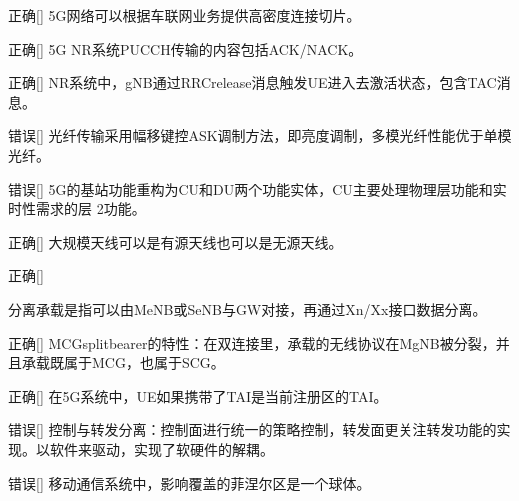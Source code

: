\begin{choice}{\;正确\;}[]
    5G网络可以根据车联网业务提供高密度连接切片。
\end{choice}

\begin{choice}{\;正确\;}[]
    5G NR系统PUCCH传输的内容包括ACK/NACK。
\end{choice}

\begin{choice}{\;正确\;}[]
    NR系统中，gNB通过RRCrelease消息触发UE进入去激活状态，包含TAC消息。
\end{choice}

\begin{choice}{\;错误\;}[]
    光纤传输采用幅移键控ASK调制方法，即亮度调制，多模光纤性能优于单模光纤。

\end{choice}


\begin{choice}{\;错误\;}[]
    5G的基站功能重构为CU和DU两个功能实体，CU主要处理物理层功能和实时性需求的层 2功能。

\end{choice}

\begin{choice}{\;正确\;}[]
    大规模天线可以是有源天线也可以是无源天线。

\end{choice}

\begin{choice}{\;正确\;}[]

    分离承载是指可以由MeNB或SeNB与GW对接，再通过Xn/Xx接口数据分离。
\end{choice}


\begin{choice}{\;正确\;}[]
    MCGsplitbearer的特性：在双连接里，承载的无线协议在MgNB被分裂，并且承载既属于MCG，也属于SCG。

\end{choice}

\begin{choice}{\;正确\;}[]
    在5G系统中，UE如果携带了TAI是当前注册区的TAI。

\end{choice}


\begin{choice}{\;错误\;}[]
    控制与转发分离：控制面进行统一的策略控制，转发面更关注转发功能的实现。以软件来驱动，实现了软硬件的解耦。

\end{choice}


\begin{choice}{\;错误\;}[]
    移动通信系统中，影响覆盖的菲涅尔区是一个球体。

\end{choice}


